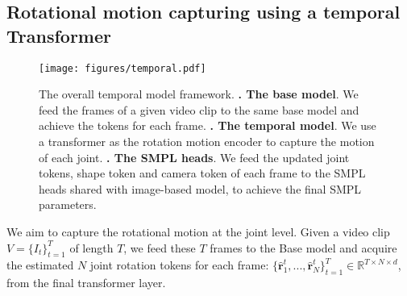 





\subsection{Rotational motion capturing using a temporal Transformer}


\begin{figure}
	\centering
	\texttt{[image: figures/temporal.pdf]}
	\caption{The overall temporal model framework. \textbf{\uppercase\expandafter{}. The base model}. We feed the frames of a given video clip to the same base model and achieve the tokens for each frame. \textbf{\uppercase\expandafter{}. The temporal model}. We use a transformer as the rotation motion encoder to capture the motion of each joint. 
	\textbf{\uppercase\expandafter{}. The SMPL heads}. We feed the updated joint tokens, shape token and camera token of each frame to the SMPL heads shared with image-based model, to achieve the final SMPL parameters.}
	\label{fig:overall}\vspace{-0.2in}
\end{figure}
We aim to capture the rotational motion at the joint level. Given a video clip $V = \{I_t\}_{t=1}^T$ of length $T$, we feed these $T$ frames to the Base model and acquire the estimated $N$ joint rotation tokens for each frame: $\{\hat{\boldsymbol{r}}_1^t,...,\hat{\boldsymbol{r}}_N^t\}_{t=1}^T \in \mathbb{R}^{T\times N \times d}$, from the final transformer layer. 

